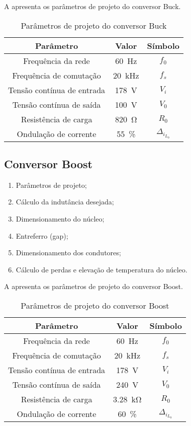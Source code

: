 A  apresenta os parâmetros de projeto do conversor Buck.
\begin{table}[!ht]
	\centering
	\caption{Parâmetros de projeto do conversor Buck}
	\label{tab:parametrosBuck}
	\begin{tabular}{@{}ccc@{}}
		\toprule
		\textbf{Parâmetro} & \textbf{Valor} & \textbf{Símbolo} \\ \midrule			
		Frequência  da rede        & \SI{60}{\hertz}     & $f_0$  \\		
		Frequência de comutação        & \SI{20}{\kilo\hertz}     & $f_s$  \\	
		Tensão contínua de entrada         &  \SI{178}{\V}      & $V_i$  \\
		Tensão contínua de saída         &  \SI{100}{\V}      & $V_0$  \\
		Resistência de carga        & \SI{820}{\ohm}      & $R_0$  \\
		Ondulação de corrente       & \SI{55}{\%}    & $\Delta_{i_{L_0}}$    \\  \bottomrule	
	\end{tabular}
\end{table}





\subsection{Conversor Boost}
\begin{enumerate}	
	\item Parâmetros de projeto; 	
	\item Cálculo da indutância desejada;	
	\item Dimensionamento do núcleo;	
	\item Entreferro (gap);
	\item  Dimensionamento dos condutores;
	\item Cálculo de perdas e elevação de temperatura do núcleo.
\end{enumerate}

A  apresenta os parâmetros de projeto do conversor Boost.
\begin{table}[!ht]
	\centering
	\caption{Parâmetros de projeto do conversor Boost}
	\label{tab:parametrosBoost}
	\begin{tabular}{@{}ccc@{}}
		\toprule
		\textbf{Parâmetro} & \textbf{Valor} & \textbf{Símbolo} \\ \midrule			
		Frequência  da rede        & \SI{60}{\hertz}     & $f_0$  \\		
		Frequência de comutação        & \SI{20}{\kilo\hertz}     & $f_s$  \\	
		Tensão contínua de entrada         &  \SI{178}{\V}      & $V_i$  \\
		Tensão contínua de saída         &  \SI{240}{\V}      & $V_0$  \\
		Resistência de carga        & \SI{3.28}{\kilo\ohm}      & $R_0$  \\
		Ondulação de corrente       & \SI{60}{\%}    & $\Delta_{i_{L_0}}$    \\  \bottomrule	
	\end{tabular}
\end{table}



